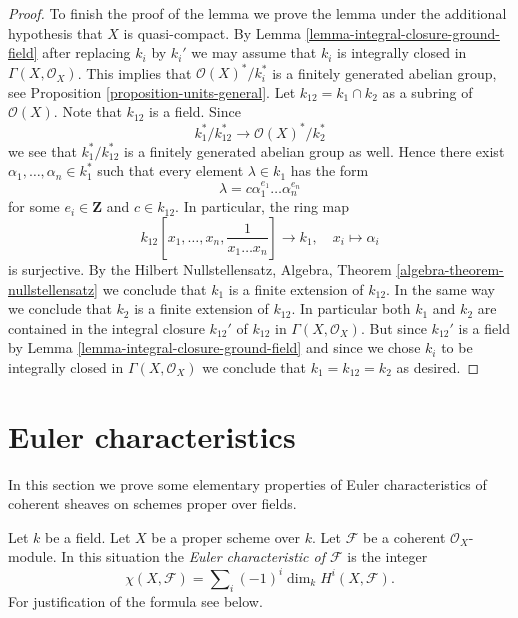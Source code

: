 \begin{proof}
\medskip\noindent
To finish the proof of the lemma we prove the lemma under the
additional hypothesis that $X$ is quasi-compact. By
Lemma \ref{lemma-integral-closure-ground-field}
after replacing $k_i$ by $k_i'$
we may assume that $k_i$ is integrally closed in $\Gamma(X, \mathcal{O}_X)$.
This implies that $\mathcal{O}(X)^*/k_i^*$ is a finitely generated
abelian group, see
Proposition \ref{proposition-units-general}.
Let $k_{12} = k_1 \cap k_2$ as a subring of $\mathcal{O}(X)$.
Note that $k_{12}$ is a field. Since
$$
k_1^*/k_{12}^* \longrightarrow \mathcal{O}(X)^*/k_2^*
$$
we see that $k_1^*/k_{12}^*$ is a finitely generated abelian group as well.
Hence there exist $\alpha_1, \ldots, \alpha_n \in k_1^*$ such that
every element $\lambda \in k_1$ has the form
$$
\lambda = c \alpha_1^{e_1} \ldots \alpha_n^{e_n}
$$
for some $e_i \in \mathbf{Z}$ and $c \in k_{12}$.
In particular, the ring map
$$
k_{12}[x_1, \ldots, x_n, \frac{1}{x_1 \ldots x_n}] \longrightarrow k_1, \quad
x_i \longmapsto \alpha_i
$$
is surjective. By the Hilbert Nullstellensatz,
Algebra, Theorem \ref{algebra-theorem-nullstellensatz}
we conclude that $k_1$ is a finite extension of $k_{12}$.
In the same way we conclude that $k_2$ is a finite extension of $k_{12}$.
In particular both $k_1$ and $k_2$ are contained in the integral closure
$k_{12}'$ of $k_{12}$ in $\Gamma(X, \mathcal{O}_X)$. But since $k_{12}'$
is a field by
Lemma \ref{lemma-integral-closure-ground-field}
and since we chose $k_i$ to be integrally closed in $\Gamma(X, \mathcal{O}_X)$
we conclude that $k_1 = k_{12} = k_2$ as desired.
\end{proof}





\section{Euler characteristics}
\label{section-euler}

\noindent
In this section we prove some elementary properties of Euler characteristics
of coherent sheaves on schemes proper over fields.

\begin{definition}
\label{definition-euler-characteristic}
Let $k$ be a field. Let $X$ be a proper scheme over $k$. Let $\mathcal{F}$
be a coherent $\mathcal{O}_X$-module. In this situation the
{\it Euler characteristic of $\mathcal{F}$} is the integer
$$
\chi(X, \mathcal{F}) = \sum\nolimits_i (-1)^i \dim_k H^i(X, \mathcal{F}).
$$
For justification of the formula see below.
\end{definition}

